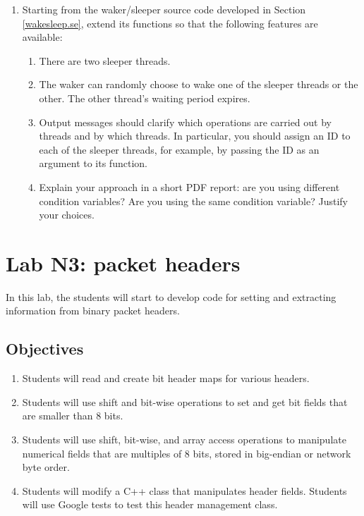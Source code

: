 \documentclass[12pt]{book}
\begin{document}
\begin{enumerate}
\item Starting from the waker/sleeper source code developed in Section \ref{wakesleep.se}, extend its functions so that the following features are available:
  \begin{enumerate}[label=\alph*)]
  \item There are two sleeper threads.
  \item The waker can randomly choose to wake one of the sleeper threads or the other. The other thread's waiting period expires.
  \item Output messages should clarify which operations are carried out by threads and by which threads. In particular, you should assign an ID to each of the sleeper threads, for example, by passing the ID as an argument to its function.
    \item Explain your approach in a short PDF report: are you using different condition variables? Are you using the same condition variable? Justify your choices. 
  \end{enumerate}
\end{enumerate}




\chapter{Lab N3: packet headers}

In this lab, the students will start to develop code for setting and extracting information from binary packet headers. 

\section{Objectives}

\begin{enumerate}[label=Objective \arabic*]
  \item\label{pl3.maps} Students will read and create bit header maps for various headers. 
\item\label{pl3.bit} Students will use shift and bit-wise operations to set and get bit fields that are smaller than 8 bits.
\item\label{pl3.byte} Students will use shift, bit-wise, and array access operations to manipulate numerical fields that are multiples of 8 bits, stored in big-endian or network byte order.
\item\label{pl3.head} Students will modify a C++ class that manipulates header fields. Students will use Google tests to test this header management class.
\end{enumerate}
\end{document}
